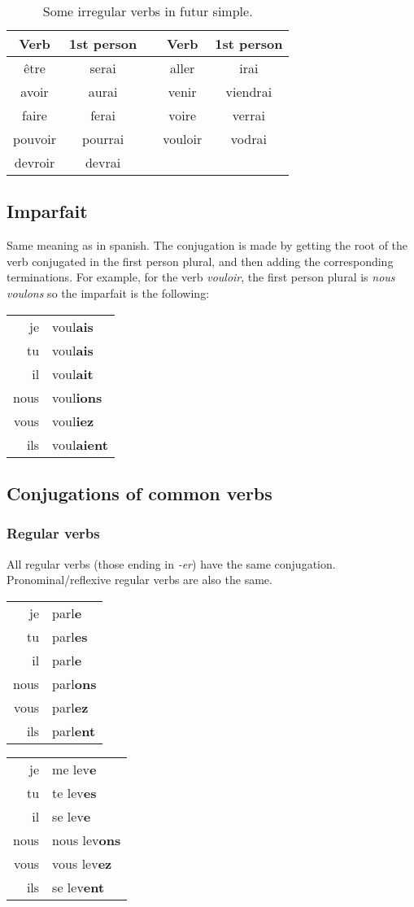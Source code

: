 \documentclass{epflnotes}
\newcommand{\conjug}[6]{\begin{tabular}{rl}
je & #1 \\
tu & #2 \\
il & #3 \\
nous & #4 \\
vous & #5 \\
ils & #6 \\
\end{tabular}}
\begin{document}
\begin{table}
\centering
\begin{tabular}{cc|p{0.05cm}|cc}
\toprule
\textbf{Verb} & \textbf{1st person } & & \textbf{Verb} & \textbf{1st person }  \\
\midrule
\^etre & serai & & aller & irai \\
avoir & aurai & & venir & viendrai \\
faire & ferai & & voire & verrai \\
pouvoir & pourrai & & vouloir & vodrai \\
devroir & devrai & &  & \\ \bottomrule
\end{tabular}
\caption{Some irregular verbs in futur simple.}
\label{tab:FutureIrregular}
\end{table}

\subsection{Imparfait}

Same meaning as in spanish. The conjugation is made by getting the root of the verb conjugated in the first person plural, and then adding the corresponding terminations. For example, for the verb \textit{vouloir}, the first person plural is \textit{nous voulons} so the imparfait is the following:

\begin{center}
\conjug
	{voul\textbf{ais}}
	{voul\textbf{ais}}
	{voul\textbf{ait}}
	{voul\textbf{ions}}
	{voul\textbf{iez}}
	{voul\textbf{aient}}
\end{center}

\subsection{Conjugations of common verbs}

\subsubsection{Regular verbs}

All regular verbs (those ending in \textit{-er}) have the same conjugation. Pronominal/reflexive regular verbs are also the same.

\begin{minipage}{0.45\textwidth}
\centering
\conjug
	{parl\textbf{e}}
	{parl\textbf{es}}
	{parl\textbf{e}}
	{parl\textbf{ons}}
	{parl\textbf{ez}}
	{parl\textbf{ent}}
\end{minipage}
\begin{minipage}{0.45\textwidth}
\centering
\conjug
	{me lev\textbf{e}}
	{te lev\textbf{es}}
	{se lev\textbf{e}}
	{nous lev\textbf{ons}}
	{vous lev\textbf{ez}}
	{se lev\textbf{ent}}
\end{minipage}
\end{document}
